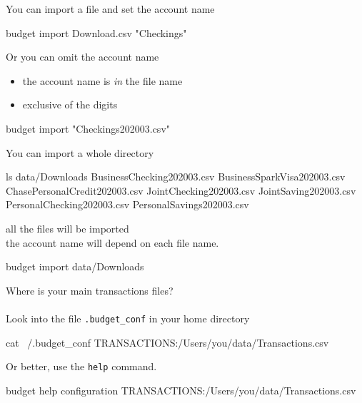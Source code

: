 \documentclass[12pt,letterpaper]{article}
\begin{document}
\begin{framed}
    \begin{minipage}[t][3in][t]{5in}
        \Large
        You can import a file and set the account name\\
        \begin{budget}
            budget import Download.csv "Checkings"
        \end{budget}
        Or you can omit the account name
        \begin{itemize}
            \item the account name is \emph{in } the file name
            \item exclusive of the digits
        \end{itemize}
        \begin{budget}
            budget import "Checkings202003.csv"
        \end{budget}
    \end{minipage}
\end{framed}
\begin{framed}
    \begin{minipage}[t][3in][t]{5in}
        \Large
        You can import a whole directory \\
        \normalsize
        \begin{budget}
            ls data/Downloads 
            BusinessChecking202003.csv
            BusinessSparkVisa202003.csv
            ChasePersonalCredit202003.csv
            JointChecking202003.csv
            JointSaving202003.csv
            PersonalChecking202003.csv
            PersonalSavings202003.csv
        \end{budget}
        all the files will be imported\\
        the account name will depend on each file name. 
        \begin{budget}
            budget import data/Downloads
        \end{budget}
    \end{minipage}
\end{framed}
\begin{framed}
    \begin{minipage}[t][3in][t]{5in}
        \Large
        Where is your main transactions files?\\ \\
        Look into the file \lstinline[language=budget,basicstyle=\Large]!.budget_conf! in your home directory 
        \normalsize
        \begin{budget}
            cat ~/.budget_conf
            TRANSACTIONS:/Users/you/data/Transactions.csv
        \end{budget}
        \Large
        Or better, use the \lstinline[language=budget,basicstyle=\Large]!help! command.
        \begin{budget}
            budget help configuration 
            TRANSACTIONS:/Users/you/data/Transactions.csv
        \end{budget}
    \end{minipage}
\end{framed}
\end{document}
